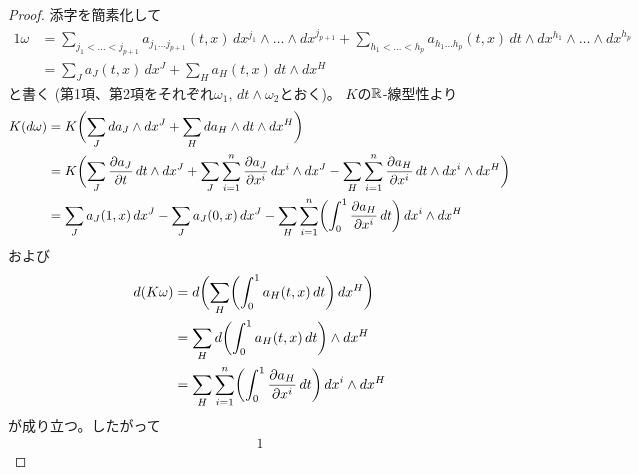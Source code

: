 \documentclass[report]{jlreq}
\begin{document}


\begin{proof}
    添字を簡素化して
    \begin{alignat}{1}
        \omega
            &= \sum_{j_1 < \dots < j_{p + 1}}
                a_{j_1 \dots j_{p + 1}}(t, x) \, dx^{j_1} \wedge \dots \wedge dx^{j_{p + 1}}
                + \sum_{h_1 < \dots < h_p}
                a_{h_1 \dots h_p}(t, x) \, dt \wedge dx^{h_1} \wedge \dots \wedge dx^{h_p} \\
            &= \sum_{J} a_J(t, x) \, dx^J
                + \sum_{H} a_H(t, x) \, dt \wedge dx^H
    \end{alignat}
    と書く (第1項、第2項をそれぞれ$\omega_1, \, dt \wedge \omega_2$とおく)。
    $K$の$\mathbb{R}$-線型性より
    \begin{alignat}{1}
        K(d\omega)
            &= K\biggl( \sum_{J} da_J \wedge dx^J
                + \sum_{H} da_H \wedge dt \wedge dx^H \biggr) \\
            &= K\biggl( \sum_{J} \deldel[a_J]{t} \, dt \wedge dx^J
                + \sum_{J} \sum_{i = 1}^n \deldel[a_J]{x^i} \, dx^i \wedge dx^J
                - \sum_{H} \sum_{i = 1}^n \deldel[a_H]{x^i} \, dt \wedge dx^i \wedge dx^H
                \biggr) \\
            &= \sum_{J} a_J(1, x) \, dx^J - \sum_{J} a_J(0, x) \, dx^J
                - \sum_{H} \sum_{i = 1}^n
                \biggl( \int_0^1 \deldel[a_H]{x^i} \, dt \biggr)
                \, dx^i \wedge dx^H
    \end{alignat}
    および
    \begin{alignat}{1}
        d(K\omega)
            &= d \biggl( \sum_{H} \biggl( \int_0^1 a_H(t, x) \, dt \biggr) \, dx^H \biggr) \\
            &= \sum_{H} d \biggl( \int_0^1 a_H(t, x) \, dt \biggr) \wedge dx^H \\
            &= \sum_{H} \sum_{i = 1}^n \biggl( \int_0^1 \deldel[a_H]{x^i} \, dt \biggr)
                \, dx^i \wedge dx^H
    \end{alignat}
    が成り立つ。したがって
    \begin{alignat}{1}

\end{alignat}
\end{proof}
\end{document}
